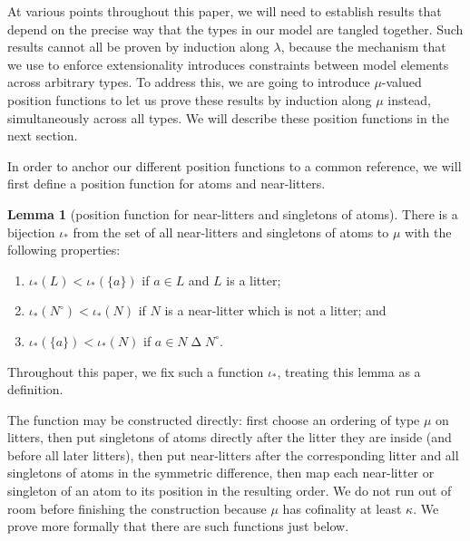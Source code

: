 \documentclass{article}
\theoremstyle{definition}
\newtheorem{lemma}[theorem]{Lemma}
\theoremstyle{remark}
\begin{document}
{At various points throughout this paper, we will need to establish results that depend on the precise way that the types in our model are tangled together.
Such results cannot all be proven by induction along $\lambda$, because the mechanism that we use to enforce extensionality introduces constraints between model elements across arbitrary types.
To address this, we are going to introduce $\mu$-valued position functions to let us prove these results by induction along $\mu$ instead, simultaneously across all types.
We will describe these position functions in the next section.

In order to anchor our different position functions to a common reference, we will first define a position function for atoms and near-litters.

\begin{lemma}[position function for near-litters and singletons of atoms]\label{lem:pos_atom_near_litter}
There is a bijection
$\iota_*$ from the set of all near-litters and singletons of atoms to $\mu$ with the following properties:

\begin{enumerate}

\item $\iota_*(L) < \iota_*(\{a\})$ if $a \in L$ and $L$ is a litter;

\item  $\iota_*(N^\circ)<\iota_*(N)$ if $N$ is a near-litter which is not a litter; and

\item $\iota_*(\{a\}) < \iota_*(N)$ if $a \in N \mathbin\Delta N^\circ$.

\end{enumerate}

\end{lemma}

Throughout this paper, we fix such a function $\iota_*$, treating this lemma as a definition.

The function may be constructed directly: first choose an ordering of type $\mu$ on litters, then put singletons of atoms directly after the litter they are inside (and before all later litters), then put near-litters after the corresponding litter and all singletons of atoms in the symmetric difference, then map each near-litter or singleton of an atom to its position in the resulting order.
We do not run out of room before finishing the construction because $\mu$ has cofinality at least $\kappa$.  We prove more formally that there are such functions just below.

}
\end{document}

